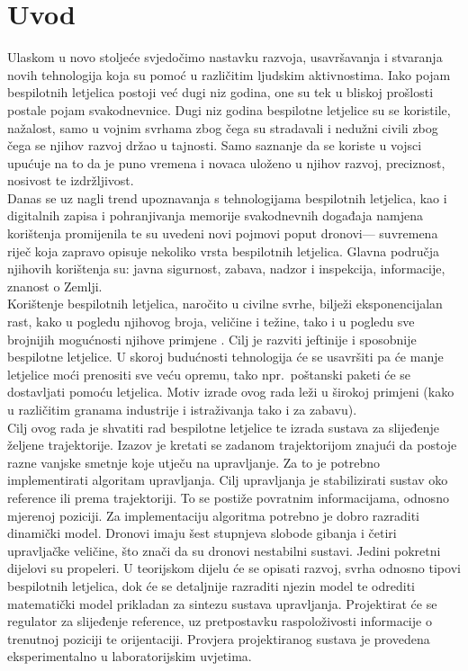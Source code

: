 \documentclass[times, utf8, diplomski]{fer}
\begin{document}
\chapter{Uvod}
Ulaskom u novo stoljeće svjedočimo nastavku razvoja, usavršavanja i stvaranja novih tehnologija koja su pomoć u različitim ljudskim aktivnostima. Iako pojam bespilotnih letjelica postoji već dugi niz godina, one su tek u bliskoj prošlosti postale pojam svakodnevnice. Dugi niz godina bespilotne letjelice su se koristile, nažalost, samo u vojnim svrhama zbog čega su stradavali i nedužni civili zbog čega se njihov razvoj držao u tajnosti. Samo saznanje da se koriste u vojsci upućuje na to da je puno vremena i novaca uloženo u njihov razvoj, preciznost, nosivost te izdržljivost.\\
Danas se uz nagli trend upoznavanja s tehnologijama bespilotnih letjelica, kao i digitalnih zapisa i pohranjivanja memorije svakodnevnih događaja namjena korištenja promijenila te su uvedeni novi pojmovi poput \glqq dronovi\grqq --- suvremena riječ koja zapravo opisuje nekoliko vrsta bespilotnih letjelica. Glavna područja njihovih korištenja su: javna sigurnost, zabava, nadzor i inspekcija, informacije, znanost o Zemlji.\\
Korištenje  bespilotnih letjelica, naročito u civilne svrhe, bilježi eksponencijalan rast, kako u pogledu njihovog broja, veličine i težine, tako i u pogledu sve brojnijih mogućnosti njihove primjene \citep{EUR-Lex}. Cilj je razviti jeftinije i sposobnije bespilotne letjelice. U skoroj budućnosti tehnologija će se usavršiti pa će manje letjelice moći prenositi sve veću opremu, tako npr.~poštanski paketi će se dostavljati pomoću letjelica. Motiv izrade ovog rada leži u širokoj primjeni (kako u različitim granama industrije i istraživanja tako i za zabavu). \\
Cilj ovog rada je shvatiti rad bespilotne letjelice te izrada sustava za slijeđenje željene trajektorije. Izazov je kretati se zadanom trajektorijom znajući da postoje razne vanjske smetnje koje utječu na upravljanje. Za to je potrebno implementirati algoritam upravljanja. Cilj upravljanja je stabilizirati sustav oko reference ili prema trajektoriji. To se postiže povratnim informacijama, odnosno mjerenoj poziciji. Za implementaciju algoritma potrebno je dobro razraditi dinamički model. Dronovi imaju šest stupnjeva slobode gibanja i četiri upravljačke veličine, što znači da su dronovi nestabilni sustavi. Jedini pokretni dijelovi su propeleri. U teorijskom dijelu će se opisati razvoj, svrha odnosno tipovi bespilotnih letjelica, dok će se detaljnije razraditi njezin model te odrediti matematički model prikladan za sintezu sustava upravljanja. Projektirat će se regulator za slijeđenje reference, uz pretpostavku raspoloživosti informacije o trenutnoj poziciji te orijentaciji. Provjera projektiranog sustava je provedena eksperimentalno u laboratorijskim uvjetima.
\end{document}
